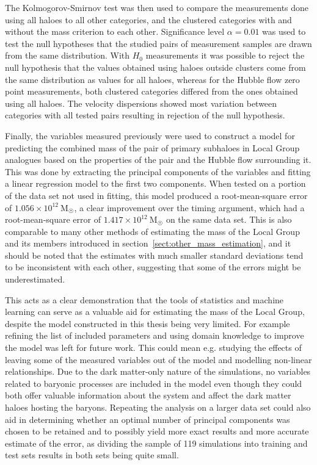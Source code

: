 \documentclass[english, twoside]{HYgradu}
\begin{document}
The Kolmogorov-Smirnov test was then used to compare the measurements done using all haloes to all other categories, and the clustered categories with and without the mass criterion to each other. Significance level $\alpha = 0.01$ was used to test the null hypotheses that the studied pairs of measurement samples are drawn from the same distribution. With $H_0$ measurements it was possible to reject the null hypothesis that the values obtained using haloes outside clusters come from the same distribution as values for all haloes, whereas for the Hubble flow zero point measurements, both clustered categories differed from the ones obtained using all haloes. The velocity dispersions showed most variation between categories with all tested pairs resulting in rejection of the null hypothesis.

Finally, the variables measured previously were used to construct a model for predicting the combined mass of the pair of primary subhaloes in Local Group analogues based on the properties of the pair and the Hubble flow surrounding it. This was done by extracting the principal components of the variables and fitting a linear regression model to the first two components. When tested on a portion of the data set not used in fitting, this model produced a root-mean-square error of $1.056 \times 10^{12}\ \mathrm{M}_{\astrosun}$, a clear improvement over the timing argument, which had a root-mean-square error of $1.417 \times 10^{12}\ \mathrm{M}_{\astrosun}$ on the same data set. This is also comparable to many other methods of estimating the mass of the Local Group and its members introduced in section~\ref{sect:other_mass_estimation}, and it should be noted that the estimates with much smaller standard deviations tend to be inconsistent with each other, suggesting that some of the errors might be underestimated.

This acts as a clear demonstration that the tools of statistics and machine learning can serve as a valuable aid for estimating the mass of the Local Group, despite the model constructed in this thesis being very limited. For example refining the list of included parameters and using domain knowledge to improve the model was left for future work. This could mean e.g. studying the effects of leaving some of the measured variables out of the model and modelling non-linear relationships. Due to the dark matter-only nature of the simulations, no variables related to baryonic processes are included in the model even though they could both offer valuable information about the system and affect the dark matter haloes hosting the baryons. Repeating the analysis on a larger data set could also aid in determining whether an optimal number of principal components was chosen to be retained and to possibly yield more exact results and more accurate estimate of the error, as dividing the sample of 119 simulations into training and test sets results in both sets being quite small.
\end{document}
